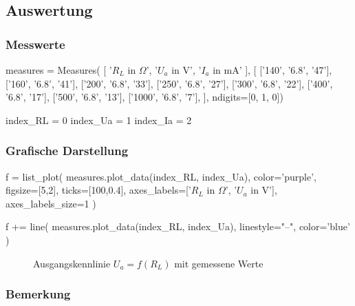 \documentclass[a4paper]{hitec}
\begin{document}
\subsection{Auswertung}

\subsubsection{Messwerte}

\begin{sagesilent}
    measures = Measures(
        [
            '$R_L$ in $\Omega$',
            '$U_a$ in V', 
            '$I_a$ in mA'
        ], [
            ['140', '6.8', '47'],
            ['160', '6.8', '41'],
            ['200', '6.8', '33'],
            ['250', '6.8', '27'],
            ['300', '6.8', '22'],
            ['400', '6.8', '17'],
            ['500', '6.8', '13'],
            ['1000', '6.8', '7'],
    ], ndigits=[0, 1, 0])

    index_RL = 0
    index_Ua = 1
    index_Ia = 2
\end{sagesilent}

\begin{center}
    \renewcommand{\arraystretch}{1.2}
\end{center}

\subsubsection{Grafische Darstellung}

\begin{sagesilent}
    f = list_plot(
        measures.plot_data(index_RL, index_Ua),
        color='purple',
        figsize=[5,2],
        ticks=[100,0.4],
        axes_labels=['$R_L$ in $\Omega$', '$U_a$ in V'],
        axes_labels_size=1
    )

    f += line(
        measures.plot_data(index_RL, index_Ua),
        linestyle="--",
        color='blue'
    )
\end{sagesilent}

\begin{figure}[H]
    \centering
    \caption{Ausgangskennlinie \textbf{$U_{a} = f(R_L)$} mit gemessene Werte}
    \label{fig:measure2}
\end{figure}

\subsubsection{Bemerkung}
\end{document}
